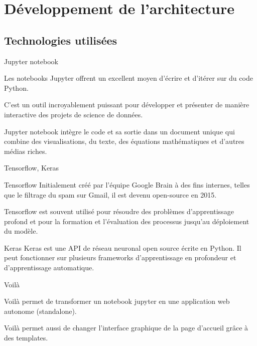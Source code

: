 \documentclass[10pt,handout]{beamer}
\newif\ifplacelogo %
\begin{document}
\section{Développement de l’architecture}

\subsection{Technologies utilisées}

\begin{frame}{Jupyter notebook}
    \begin{block}{}
        Les notebooks Jupyter offrent un excellent moyen d’écrire et d’itérer sur du code Python.
    \end{block}

    \begin{block}{}
        C’est
        un outil incroyablement puissant pour développer et présenter de manière interactive des projets
        de science de données.
    \end{block}

    \begin{block}{}
        Jupyter notebook intègre le code et sa sortie dans un document unique qui
        combine des visualisations, du texte, des équations mathématiques et d’autres médias riches.
    \end{block}
\end{frame}
\placelogofalse
\begin{frame}{Tensorflow, Keras}
    \begin{block}{Tensorflow}
        Initialement créé par l’équipe Google Brain à des fins internes, telles
        que le filtrage du spam sur Gmail, il est devenu open-source en 2015.
    \end{block}

    \begin{block}{}
        Tensorflow est souvent utilisé pour résoudre des problèmes d’apprentissage profond et pour la
        formation et l’évaluation des processus jusqu’au déploiement du modèle.
    \end{block}

    \begin{block}{Keras}
        Keras est une API de réseau neuronal open source écrite en Python. Il peut fonctionner sur
        plusieurs frameworks d’apprentissage en profondeur et d’apprentissage automatique.
    \end{block}

\end{frame}
\placelogotrue
\begin{frame}{Voilà}
    \begin{block}{}
        Voilà permet de transformer un
        notebook jupyter en une application web autonome (standalone).
    \end{block}
    \begin{block}{}
        Voilà permet aussi de changer l’interface graphique de la page d’accueil grâce à des templates.
    \end{block}    
\end{frame} 
\end{document}
